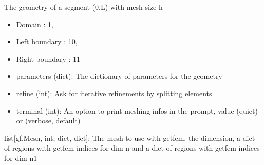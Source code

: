 \documentclass[letterpaper,10pt,english]{sphinxmanual}
\begin{document}

\begin{fulllineitems}
\label{\detokenize{scrimp.utils:scrimp.utils.mesh.Interval}}
\pysigstartsignatures
\pysiglinewithargsret
{}
{\sphinxparamcomma {}\sphinxparamcomma {}\sphinxparamcomma {}}
{}
\pysigstopsignatures
\sphinxAtStartPar
The geometry of a segment (0,L) with mesh size h
\begin{itemize}
\item {} 
\sphinxAtStartPar
Domain : 1,

\item {} 
\sphinxAtStartPar
Left boundary : 10,

\item {} 
\sphinxAtStartPar
Right boundary : 11

\end{itemize}
\begin{description}
\begin{itemize}
\item {} 
\sphinxAtStartPar
parameters (dict): The dictionary of parameters for the geometry

\item {} 
\sphinxAtStartPar
refine (int): Ask for iterative refinements by splitting elements

\item {} 
\sphinxAtStartPar
terminal (int): An option to print meshing infos in the prompt, value  (quiet) or  (verbose, default)

\end{itemize}

\sphinxAtStartPar
list{[}gf.Mesh, int, dict, dict{]}: The mesh to use with getfem, the dimension, a dict of regions with getfem indices for dim n and a dict of regions with getfem indices for dim n\sphinxhyphen{}1

\end{description}

\end{fulllineitems}
\end{document}

